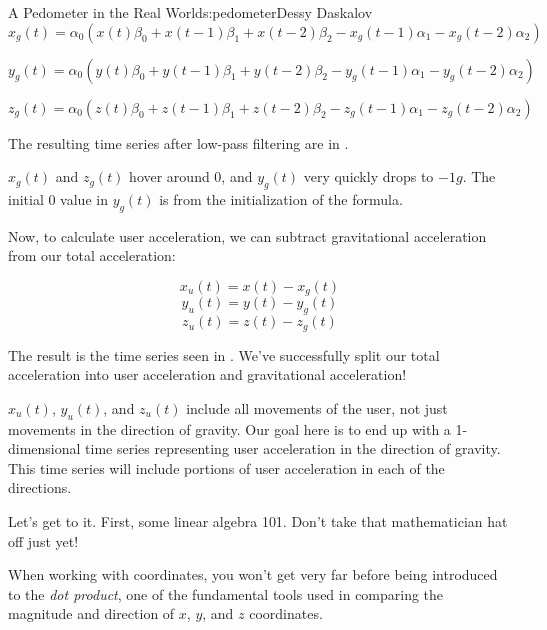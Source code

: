 \begin{aosachapter}{A Pedometer in the Real World}{s:pedometer}{Dessy Daskalov}
\[x_{g}(t) = \alpha_{0}(x(t)\beta_{0} + x(t-1)\beta_{1} + x(t-2)\beta_{2} - x_{g}(t-1)\alpha_{1} - x_{g}(t-2)\alpha_{2})\]

\[y_{g}(t) = \alpha_{0}(y(t)\beta_{0} + y(t-1)\beta_{1} + y(t-2)\beta_{2} - y_{g}(t-1)\alpha_{1} - y_{g}(t-2)\alpha_{2})\]

\[z_{g}(t) = \alpha_{0}(z(t)\beta_{0} + z(t-1)\beta_{1} + z(t-2)\beta_{2} - z_{g}(t-1)\alpha_{1} - z_{g}(t-2)\alpha_{2})\]

The resulting time series after low-pass filtering are in
.


$x_{g}(t)$ and $z_{g}(t)$ hover around 0, and $y_{g}(t)$ very quickly
drops to $-1g$. The initial 0 value in $y_{g}(t)$ is from the
initialization of the formula.

Now, to calculate user acceleration, we can subtract gravitational
acceleration from our total acceleration:

\[
x_{u}(t) = x(t) - x_{g}(t)
\] \[
y_{u}(t) = y(t) - y_{g}(t)
\] \[
z_{u}(t) = z(t) - z_{g}(t)
\]

The result is the time series seen in
. We've successfully split
our total acceleration into user acceleration and gravitational
acceleration!


\label{isolating-user-acceleration-in-the-direction-of-gravity}

$x_{u}(t)$, $y_{u}(t)$, and $z_{u}(t)$ include all movements of the
user, not just movements in the direction of gravity. Our goal here is
to end up with a 1-dimensional time series representing user
acceleration in the direction of gravity. This time series will include
portions of user acceleration in each of the directions.

Let's get to it. First, some linear algebra 101. Don't take that
mathematician hat off just yet!

\label{the-dot-product}

When working with coordinates, you won't get very far before being
introduced to the \emph{dot product}, one of the fundamental tools used
in comparing the magnitude and direction of $x$, $y$, and $z$
coordinates.


\end{aosachapter}
